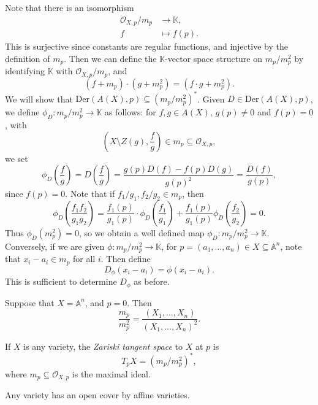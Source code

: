 \documentclass[12pt]{article}
\begin{document}
\begin{proofbox}
	Note that there is an isomorphism
	\begin{align*}
		\mathcal{O}_{X, p} / m_p &\to \mathbb{K}, \\
		f &\mapsto f(p).
	\end{align*}
	This is surjective since constants are regular functions, and injective by the definition of $m_p$. Then we can define the $\mathbb{K}$-vector space structure on $m_p / m_p^2$ by identifying $\mathbb{K}$ with $\mathcal{O}_{X,p} / m_p$, and
	\[
		(f + m_p) \cdot (g + m_p^2) = (f \cdot g + m_p^2).
	\]
	We will show that $\mathrm{Der}(A(X), p) \subseteq (m_p/ m_p^2)^\ast$. Given $D \in \mathrm{Der}(A(X), p)$, we define $\phi_D : m_p / m_p^2 \to \mathbb{K}$ as follows: for $f, g \in A(X)$, $g(p) \neq 0$ and $f(p) = 0$, with
	\[
		\left( X \setminus Z(g), \frac{f}{g} \right) \in m_p \subseteq \mathcal{O}_{X, p},
	\]
	we set
	\[
	\phi_D \left( \frac{f}{g} \right) = D \left( \frac{f}{g} \right) = \frac{g(p) D(f) - f(p) D(g)}{g(p)^2} = \frac{D(f)}{g(p)},
	\]
	since $f(p) = 0$. Note that if $f_1/g_1, f_2/g_2 \in m_p$, then
	\[
	\phi_D \left( \frac{f_1 f_2}{g_1 g_2} \right) = \frac{f_1(p)}{g_1(p)} \cdot \phi_D \left( \frac{f_1}{g_1} \right) + \frac{f_1(p)}{g_1(p)} \phi_D \left( \frac{f_2}{g_2} \right) = 0.
	\]
	Thus $\phi_D (m_p^2) = 0$, so we obtain a well defined map $\phi_D : m_p/m_p^2 \to \mathbb{K}$. Conversely, if we are given $\phi : m_p /m_p^2 \to \mathbb{K}$, for $p = (a_1, \ldots, a_n) \in X \subseteq \mathbb{A}^n$, note that $x_i - a_i \in m_p$ for all $i$. Then define
	\[
	D_\phi(x_i - a_i) = \phi(x_i - a_i).
	\]
	This is sufficient to determine $D_\phi$ as before.
\end{proofbox}

\begin{exbox}
	Suppose that $X = \mathbb{A}^n$, and $p = 0$. Then
	\[
		\frac{m_p}{m_p^2} = \frac{(X_1, \ldots, X_n)}{(X_1, \ldots, X_n)^2}.
	\]
\end{exbox}

\begin{definition}
	If $X$ is any variety, the \emph{Zariski tangent space} to $X$ at $p$ is
	\[
	T_p X = (m_p/m_p^2)^\ast,
	\]
	where $m_p \subseteq \mathcal{O}_{X, p}$ is the maximal ideal.
\end{definition}

\begin{theorem}
	Any variety has an open cover by affine varieties.
\end{theorem}
\end{document}
